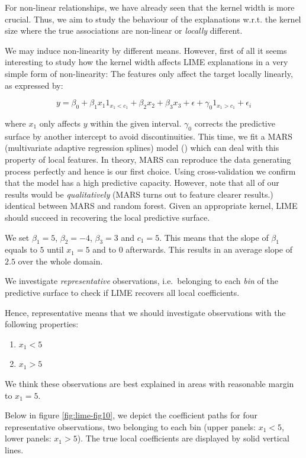 \documentclass[
]{krantz}
\begin{document}
For non-linear relationships, we have already seen that the kernel width is more crucial.
Thus, we aim to study the behaviour of the explanations w.r.t. the kernel size where the true associations are non-linear or \emph{locally} different.

We may induce non-linearity by different means.
However, first of all it seems interesting to study how the kernel width affects LIME explanations in a very simple form of non-linearity:
The features only affect the target locally linearly, as expressed by:

\[ y = \beta_0 + \beta_1 x_1 1_{x_1<c_1} + \beta_2 x_2 + \beta_3 x_3 + \epsilon + \gamma_0 1_{x_1>c_1} + \epsilon_i\]

where \(x_1\) only affects \(y\) within the given interval.
\(\gamma_0\) corrects the predictive surface by another intercept to avoid discontinuities.
This time, we fit a MARS (multivariate adaptive regression splines) model (\citet{friedman1991multivariate}) which can deal with this property of local features.
In theory, MARS can reproduce the data generating process perfectly and hence is our first choice.
Using cross-validation we confirm that the model has a high predictive capacity.
However, note that all of our results would be \emph{qualitatively} (MARS turns out to feature clearer results.) identical between MARS and random forest.
Given an appropriate kernel, LIME should succeed in recovering the local predictive surface.

We set \(\beta_1 = 5\), \(\beta_2 = -4\), \(\beta_3 = 3\) and \(c_1 = 5\).
This means that the slope of \(\beta_1\) equals to \(5\) until \(x_1 = 5\) and to \(0\) afterwards.
This results in an average slope of \(2.5\) over the whole domain.

We investigate \emph{representative} observations, i.e.~belonging to each \emph{bin} of the predictive surface to check if LIME recovers all local coefficients.

Hence, representative means that we should investigate observations with the following properties:

\begin{enumerate}
\def\labelenumi{\arabic{enumi}.}
\item
  \(x_1 < 5\)
\item
  \(x_1 > 5\)
\end{enumerate}

We think these observations are best explained in areas with reasonable margin to \(x_1 = 5\).

Below in figure \ref{fig:lime-fig10}, we depict the coefficient paths for four representative observations, two belonging to each bin (upper panels: \(x_1 < 5\), lower panels: \(x_1 > 5\)).
The true local coefficients are displayed by solid vertical lines.
\end{document}
